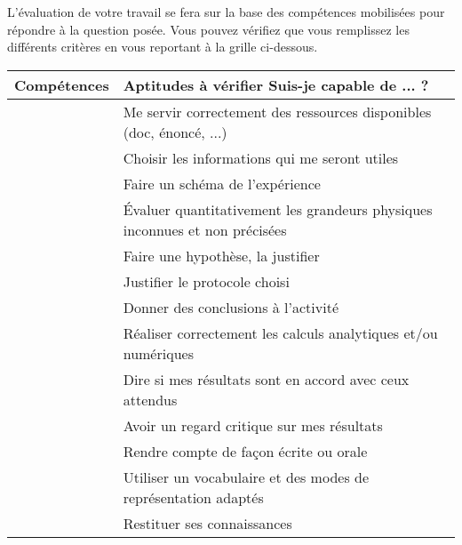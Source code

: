 \documentclass[12pt,a4paper]{article}
\begin{document}
L'évaluation de votre travail se fera sur la base des compétences mobilisées pour répondre à la question posée.
Vous pouvez vérifiez que vous remplissez les différents critères en vous reportant à la grille ci-dessous. 

\begin{center}
\begin{tabular}{l|l}
\textbf{Compétences} & Aptitudes à vérifier \hfill \textbf{Suis-je capable de ... ?} \\
\hline
\hline
\app				 		& Me servir correctement des ressources disponibles (doc, énoncé, ...) \\
		         			& Choisir les informations qui me seront utiles \\
							& Faire un schéma de l'expérience \\
							& Évaluer quantitativement les grandeurs physiques inconnues et non précisées \\
\hline
\anarai		  		& Faire une hypothèse, la justifier \\
							& Justifier le protocole choisi \\
      						& Donner des conclusions à l'activité \\
\hline
\rea     				& Réaliser correctement les calculs analytiques et/ou numériques \\
\hline
\val		      			& Dire si mes résultats sont en accord avec ceux attendus \\
			       			& Avoir un regard critique sur mes résultats \\
\hline
\com				  	& Rendre compte de façon écrite ou orale \\
		         			& Utiliser un vocabulaire et des modes de représentation adaptés \\
\hline
\rco         			& Restituer ses connaissances \\
\end{tabular}
\end{center}
\end{document}
